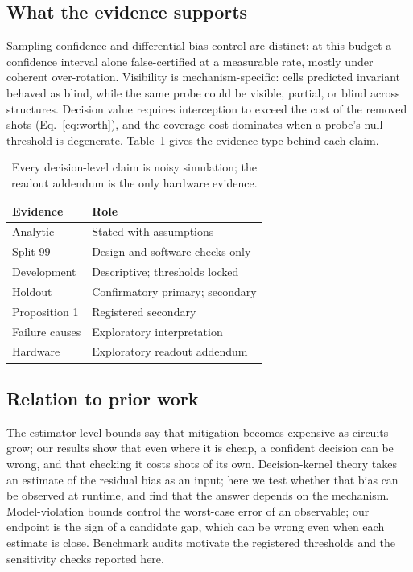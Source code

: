 \documentclass[10pt,twocolumn]{article}
\begin{document}
\subsection{What the evidence supports}

Sampling confidence and differential-bias control are distinct: at this budget
a confidence interval alone false-certified at a measurable rate, mostly under
coherent over-rotation. Visibility is mechanism-specific: cells predicted
invariant behaved as blind, while the same probe could be visible, partial, or
blind across structures. Decision value requires interception to exceed the
cost of the removed shots (Eq.~\eqref{eq:worth}), and the coverage cost
dominates when a probe's null threshold is degenerate. Table~\ref{tab:status}
gives the evidence type behind each claim.

\begin{table}[t]
\centering
\caption{Every decision-level claim is noisy simulation; the readout addendum
is the only hardware evidence.}
\label{tab:status}
\small
\begin{tabularx}{\columnwidth}{@{}lX@{}}
\toprule
Evidence & Role \\
\midrule
Analytic & Stated with assumptions \\
Split 99 & Design and software checks only \\
Development & Descriptive; thresholds locked \\
Holdout & Confirmatory primary; secondary \\
Proposition 1 & Registered secondary \\
Failure causes & Exploratory interpretation \\
Hardware & Exploratory readout addendum \\
\bottomrule
\end{tabularx}
\end{table}

\subsection{Relation to prior work}

The estimator-level bounds\cite{takagi2022,takagi2023,tsubouchi2023,quek2024}
say that mitigation becomes expensive as circuits grow; our results show that
even where it is cheap, a confident decision can be wrong, and that checking
it costs shots of its own. Decision-kernel theory\cite{scavino2026} takes an estimate
of the residual bias as an input; here we test whether that bias can
be observed at runtime, and find that the answer depends on the mechanism.
Model-violation bounds\cite{govia2025} control the worst-case error of an
observable; our endpoint is the sign of a candidate gap, which can be wrong
even when each estimate is close. Benchmark audits\cite{koster2026,koster2026claim}
motivate the registered thresholds and the sensitivity checks reported here.
\end{document}
